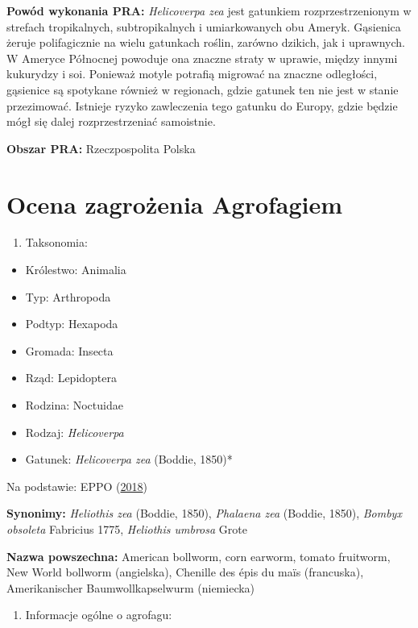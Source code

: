 \documentclass[polish,a4paper]{article}
\providecommand{\tightlist}{%
  \setlength{\itemsep}{0pt}\setlength{\parskip}{0pt}}
\begin{document}
\textbf{Powód wykonania PRA:} \emph{Helicoverpa zea} jest gatunkiem
rozprzestrzenionym w strefach tropikalnych, subtropikalnych i
umiarkowanych obu Ameryk. Gąsienica żeruje polifagicznie na wielu
gatunkach roślin, zarówno dzikich, jak i uprawnych. W Ameryce Północnej
powoduje ona znaczne straty w uprawie, między innymi kukurydzy i soi.
Ponieważ motyle potrafią migrować na znaczne odległości, gąsienice są
spotykane również w regionach, gdzie gatunek ten nie jest w stanie
przezimować. Istnieje ryzyko zawleczenia tego gatunku do Europy, gdzie
będzie mógł się dalej rozprzestrzeniać samoistnie.

\textbf{Obszar PRA:} Rzeczpospolita Polska

\part{Ocena zagrożenia
Agrofagiem}\label{part-ocena-zagrozenia-agrofagiem}

\begin{enumerate}
\def\labelenumi{(\arabic{enumi})}
\tightlist
\item
  Taksonomia:
\end{enumerate}

\begin{itemize}
\item
  Królestwo: Animalia
\item
  Typ: Arthropoda
\item
  Podtyp: Hexapoda
\item
  Gromada: Insecta
\item
  Rząd: Lepidoptera
\item
  Rodzina: Noctuidae
\item
  Rodzaj: \emph{Helicoverpa}
\item
  Gatunek: \emph{Helicoverpa zea} (Boddie, 1850)*
\end{itemize}

Na podstawie: EPPO (\protect\hyperlink{ref-eppo2018}{2018})

\textbf{Synonimy:} \emph{Heliothis zea} (Boddie, 1850), \emph{Phalaena
zea} (Boddie, 1850), \emph{Bombyx obsoleta} Fabricius 1775,
\emph{Heliothis umbrosa} Grote

\textbf{Nazwa powszechna:} American bollworm, corn earworm, tomato
fruitworm, New World bollworm (angielska), Chenille des épis du maïs
(francuska), Amerikanischer Baumwollkapselwurm (niemiecka)

\begin{enumerate}
\def\labelenumi{(\arabic{enumi})}
\setcounter{enumi}{1}
\tightlist
\item
  Informacje ogólne o agrofagu:
\end{enumerate}
\end{document}
